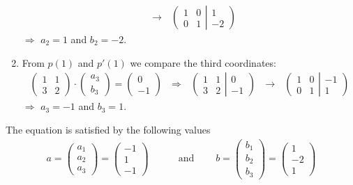 \documentclass{article}
\begin{document}
\begin{enumerate}
\begin{align}
                    \ \ \ \rightarrow\ \ \  \left(\begin{array}{cc} 1&0\\0&1 \end{array} \right | \left. \begin{array}{c} 1\\-2 \end{array}\right)
                \end{align}
                $\Rightarrow$ $a_2 = 1$ and $b_2 = -2$.
            \item From $p(1)$ and $p'(1)$ we compare the third coordinates:
                \begin{align}
                    \left(\begin{matrix} 1&1\\3&2 \end{matrix}\right) \cdot \left(\begin{matrix} a_3\\b_3 \end{matrix}\right) = \left(\begin{matrix} 0\\-1 \end{matrix}\right)
                    \ \ \ \Rightarrow\ \ \  \left(\begin{array}{cc} 1&1\\3&2 \end{array} \right | \left. \begin{array}{c} 0\\-1 \end{array}\right)
                    \ \ \ \rightarrow\ \ \  \left(\begin{array}{cc} 1&0\\0&1 \end{array} \right | \left. \begin{array}{c} -1\\1 \end{array}\right)
                \end{align}
                $\Rightarrow$ $a_3 = -1$ and $b_3 = 1$.
        \end{enumerate}
        The equation is satisfied by the following values
        \begin{align}
            a = \left(\begin{matrix} a_1\\a_2\\a_3 \end{matrix}\right) = \left(\begin{matrix} -1\\1\\-1 \end{matrix}\right)
            \ \ \ \ \ \ \ \ \ \ &\text{and}\ \ \ \ \ \ \ \ \ \ 
            b = \left(\begin{matrix} b_1\\b_2\\b_3 \end{matrix}\right) = \left(\begin{matrix} 1\\-2\\1 \end{matrix}\right)
        \end{align}
\end{document}
